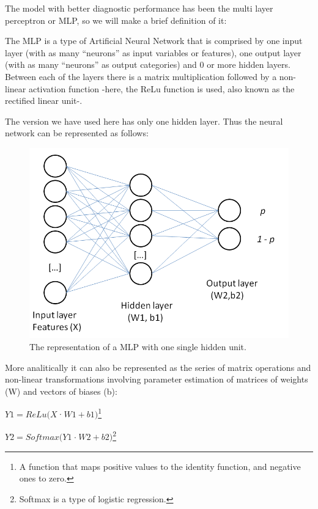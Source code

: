 \documentclass[a4paper,12pt]{elsarticle}  %
\begin{document}
The model with better diagnostic performance has been the multi layer perceptron or MLP, so we will make a brief definition of it:

The MLP is a type of Artificial Neural Network that is comprised by one input layer (with as many ``neurons'' as input variables or features), one output layer (with as many ``neurons'' as output categories) and 0 or more hidden layers. Between each of the layers there is a matrix multiplication followed by a non-linear activation function -here, the ReLu function is used, also known as the rectified linear unit-.

The version we have used here has only one hidden layer. Thus the neural network can be represented as follows:

\begin{figure}[h] 
	\centering	
	\includegraphics[width=\textwidth]{fig_MLP_neurones.png}	
	\caption{The representation of a MLP with one single hidden unit.}
	\label{fig:calibration_vs_no_calibration}
\end{figure}


More analitically it can also be represented as the series of matrix operations and non-linear transformations involving parameter estimation of matrices of weights (W) and vectors of biases (b)\cite{tfWithoutphd}:

\begin{center}
$Y1 = ReLu(X$·$W1 + b1)$\footnote{A function that maps positive values to the identity function, and negative ones to zero.}
\end{center}

\begin{center}
$Y2 = Softmax(Y1$·$W2 + b2)$\footnote{Softmax is a type of logistic regression.}
\end{center}
\end{document}
